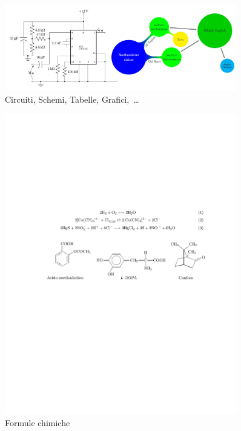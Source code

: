 \documentclass[a4paper,12pt]{article}
\newcommand{\1}{\ensuremath{\mathds{1}}}
\begin{document}
\begin{figure}[!h]\centering
  \includegraphics[width=0.9\textwidth]{img/schemi}
  \caption{Circuiti, Schemi, Tabelle, Grafici,~\dots}
\end{figure}
\newpage\vspace{100px}
\begin{figure}[!h]\centering
  \includegraphics[width=0.9\textwidth]{img/chimica}
  \caption{Formule chimiche}
\end{figure}\vspace{100px}
\end{document}
